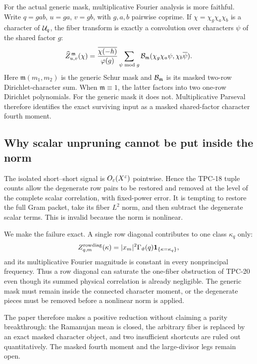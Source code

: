 For the actual generic mask, multiplicative Fourier analysis is more
faithful.  Write \(q=gab\), \(u=ga\), \(v=gb\), with \(g,a,b\) pairwise
coprime.  If \(\chi=\chi_g\chi_a\chi_b\) is a character of
\(\mathcal U_q\), the fiber transform is exactly a convolution over characters
\(\psi\) of the shared factor \(g\):
\begin{equation}
 \widehat Z_{u,v}^{\,\mathfrak m}(\chi)
 =\frac{\overline{\chi(-h)}}{\varphi(g)}
 \sum_{\psi\bmod g}
 \mathcal B_{\mathfrak m}
 (\chi_g\chi_a\psi,\chi_b\overline\psi).
 \label{eq:tpc21-intro-character-convolution}
\end{equation}
Here \(\mathfrak m(m_1,m_2)\) is the generic Schur mask and
\(\mathcal B_{\mathfrak m}\) is its masked two-row Dirichlet-character sum.
When \(\mathfrak m\equiv1\), the latter factors into two one-row
Dirichlet polynomials.  For the generic mask it does not.  Multiplicative
Parseval therefore identifies the exact surviving input as a masked
shared-factor character fourth moment.

\subsection{Why scalar unpruning cannot be put inside the norm}

The isolated short--short signal is \(O_\varepsilon(X^\varepsilon)\) pointwise.
Hence the TPC-18 tuple counts allow the degenerate row pairs to be
restored and removed at the level of the complete scalar correlation,
with fixed-power error.  It is tempting to restore the full Gram packet,
take its fiber \(L^2\) norm, and then subtract the degenerate scalar
terms.  This is invalid because the norm is nonlinear.

We make the failure exact.  A single row diagonal contributes to one
class \(\kappa_q\) only:
\begin{equation}
 Z_{q,m}^{\rm rowdiag}(\kappa)
 =|x_m|^2\Gamma_\vartheta(q)
  \mathbf 1_{\{\kappa=\kappa_q\}},
 \label{eq:tpc21-intro-diagonal-spike}
\end{equation}
and its multiplicative Fourier magnitude is constant in every
nonprincipal frequency.  Thus a row
diagonal can saturate the one-fiber obstruction of TPC-20 even though
its summed physical correlation is already negligible.  The generic
mask must remain inside the connected character moment, or the
degenerate pieces must be removed before a nonlinear norm is applied.

The paper therefore makes a positive reduction without claiming a
parity breakthrough: the Ramanujan mean is closed, the arbitrary fiber
is replaced by an exact masked character object, and two insufficient
shortcuts are ruled out quantitatively.  The masked fourth moment and
the large-divisor legs remain open.

